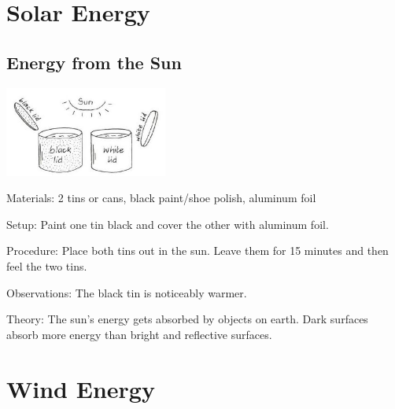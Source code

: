 \begin{multicols}{2}
\columnbreak


\section*{Solar Energy}


\subsection{Energy from the Sun}

\begin{center}
\includegraphics[width=0.4\textwidth]{./img/vso/solar-heat.jpg}
\end{center}

\begin{description*}
\item[Materials:]{2 tins or cans, black paint/shoe polish, aluminum foil}
\item[Setup:]{Paint one tin black and cover the other with aluminum foil.}
\item[Procedure:]{Place both tins out in the sun. Leave them for 15 minutes and then feel the two tins.}
\item[Observations:]{The black tin is noticeably warmer.}
\item[Theory:]{The sun's energy gets absorbed by objects on earth. Dark surfaces absorb more energy than bright and reflective surfaces.}
\end{description*}


\section*{Wind Energy}



\end{multicols}
